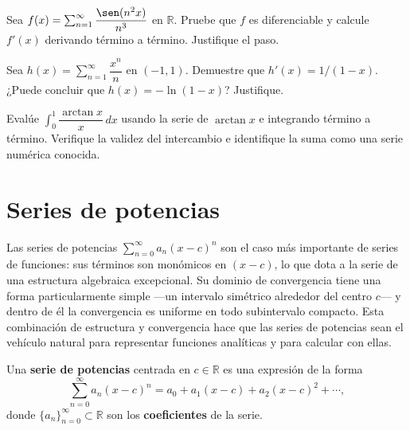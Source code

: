 \begin{prob} Sea $f(x) = \sum_{n=1}^\infty \dfrac{\sen(n^2 x)}{n^3}$
          en $\mathbb{R}$. Pruebe que $f$ es diferenciable y calcule
          $f'(x)$ derivando término a término. Justifique el paso.
\end{prob}

\begin{prob} Sea $h(x) = \sum_{n=1}^\infty \dfrac{x^n}{n}$ en $(-1,1)$.
          Demuestre que $h'(x) = 1/(1-x)$. ¿Puede concluir que
          $h(x) = -\ln(1-x)$? Justifique.
\end{prob}

\begin{prob} Evalúe $\int_0^1 \dfrac{\arctan x}{x}\,dx$ usando la serie
          de $\arctan x$ e integrando término a término. Verifique la
          validez del intercambio e identifique la suma como una
          serie numérica conocida.

\end{prob}

\section{Series de potencias}

Las series de potencias $\sum_{n=0}^\infty a_n (x-c)^n$ son el caso
más importante de series de funciones: sus términos son monómicos en
$(x-c)$, lo que dota a la serie de una estructura algebraica
excepcional. Su dominio de convergencia tiene una forma particularmente
simple ---un intervalo simétrico alrededor del centro $c$--- y dentro
de él la convergencia es uniforme en todo subintervalo compacto. Esta
combinación de estructura y convergencia hace que las series de
potencias sean el vehículo natural para representar funciones
analíticas y para calcular con ellas.

\begin{definition}
\label{def:serie_potencias}
Una \textbf{serie de potencias} centrada en $c \in \mathbb{R}$ es una
expresión de la forma
\[
    \sum_{n=0}^\infty a_n (x - c)^n
    = a_0 + a_1(x-c) + a_2(x-c)^2 + \cdots,
\]
donde $\{a_n\}_{n=0}^\infty \subset \mathbb{R}$ son los
\textbf{coeficientes} de la serie.
\end{definition}

